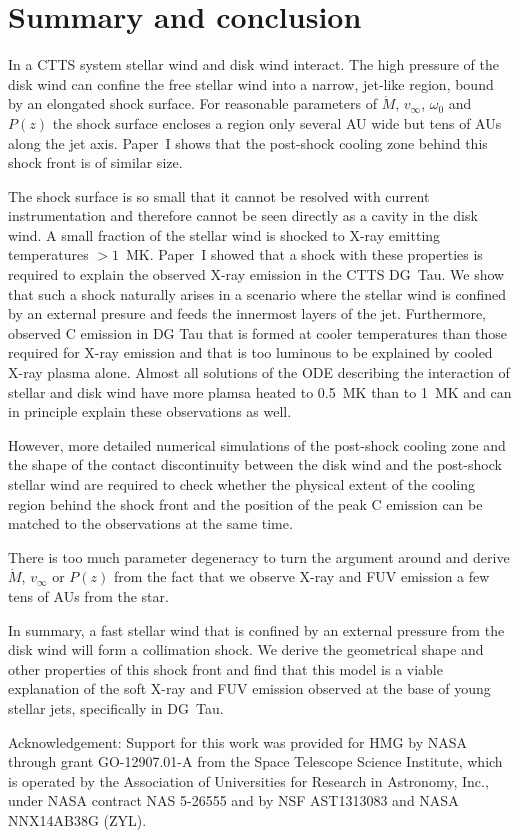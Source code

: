 \section{Summary and conclusion}
\label{sect:conclusion}
In a CTTS system stellar wind and disk wind interact. The high pressure of the disk wind can confine the free stellar wind into a narrow, jet-like region, bound by an elongated shock surface. For reasonable parameters of $\dot M$, $v_\infty$, $\omega_0$ and $P(z)$ the shock surface encloses a region only several AU wide but tens of AUs along the jet axis. 
Paper~I shows that the post-shock cooling zone behind this shock front is of similar size.
 
The shock surface is so small that it cannot be resolved with current instrumentation and therefore cannot be seen directly as a cavity in the disk wind. A small fraction of the stellar wind is shocked to X-ray emitting temperatures $>1$~MK. 
Paper~I showed that a shock with these properties is required to explain the observed X-ray emission in the CTTS DG~Tau. We show that such a shock naturally arises in a scenario where the stellar wind is confined by an external presure and feeds the innermost layers of the jet.
Furthermore, \citet{2013A&A...550L...1S} observed C emission in DG Tau that is formed at cooler temperatures than those required for X-ray emission and that is too luminous to be explained by cooled X-ray plasma alone. Almost all solutions of the ODE describing the interaction of stellar and disk wind have more plamsa heated to 0.5~MK than to 1~MK and can in principle explain these observations as well.

However, more detailed numerical simulations of the post-shock cooling zone and the shape of the contact discontinuity between the disk wind and the post-shock stellar wind are required to check whether the physical extent of the cooling region behind the shock front and the position of the peak  C emission can be matched to the observations at the same time.

There is too much parameter degeneracy to turn the argument around and derive $\dot M$, $v_\infty$ or $P(z)$ from the fact that we observe X-ray and FUV emission a few tens of AUs from the star.

In summary, a fast stellar wind that is confined by an external pressure from the disk wind will form a collimation shock. We derive the geometrical shape and other properties of this shock front and find that this model is a viable explanation of the soft X-ray and FUV emission observed at the base of young stellar jets, specifically in DG~Tau.

Acknowledgement: Support for this work was provided for HMG by NASA through grant GO-12907.01-A from the Space Telescope Science Institute, which is operated by the Association of Universities for Research in Astronomy, Inc., under NASA contract NAS 5-26555 and by NSF AST1313083 and NASA NNX14AB38G (ZYL).